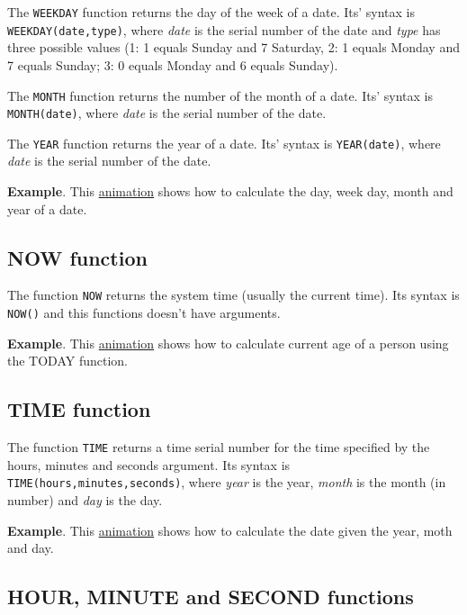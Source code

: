 The \texttt{WEEKDAY} function returns the day of the week of a date. Its' syntax is \texttt{WEEKDAY(date,type)}, where \emph{date} is the serial number of the date and \emph{type} has three possible values (1: 1 equals Sunday and 7 Saturday, 2: 1 equals Monday and 7 equals Sunday; 3: 0 equals Monday and 6 equals Sunday).

The \texttt{MONTH} function returns the number of the month of a date. Its' syntax is \texttt{MONTH(date)}, where \emph{date} is the serial number of the date.

The \texttt{YEAR} function returns the year of a date. Its' syntax is \texttt{YEAR(date)}, where \emph{date} is the serial number of the date.

\textbf{Example}. This \href{http://aprendeconalf.es/office/excel/manual/img/example_function_day.gif}{animation} shows how to calculate the day, week day, month and year of a date.

\subsection{NOW function}\hypertarget{now-function}{}\label{now-function}

The function \texttt{NOW} returns the system time (usually the current time). Its syntax is \texttt{NOW()} and this functions doesn't have arguments.

\textbf{Example}. This \href{http://aprendeconalf.es/office/excel/manual/img/example_function_now.gif}{animation} shows how to calculate current age of a person using the TODAY function.

\subsection{TIME function}\hypertarget{time-function}{}\label{time-function}

The function \texttt{TIME} returns a time serial number for the time specified by the hours, minutes and seconds argument. Its syntax is \texttt{TIME(hours,minutes,seconds)}, where \emph{year} is the year, \emph{month} is the month (in number) and \emph{day} is the day.

\textbf{Example}. This \href{http://aprendeconalf.es/office/excel/manual/img/example_function_time.gif}{animation} shows how to calculate the date given the year, moth and day.

\subsection{HOUR, MINUTE and SECOND functions}\hypertarget{hour-minute-and-second-functions}{}\label{hour-minute-and-second-functions}

